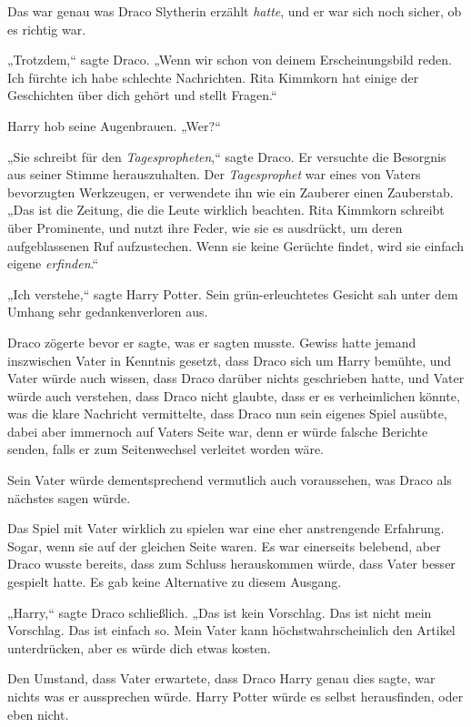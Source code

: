 {Das war genau was Draco Slytherin erzählt \emph{hatte}, und er war sich noch sicher, ob es richtig war.

„Trotzdem,“ sagte Draco. „Wenn wir schon von deinem Erscheinungsbild reden. Ich fürchte ich habe schlechte Nachrichten. Rita Kimmkorn hat einige der Geschichten über dich gehört und stellt Fragen.“

Harry hob seine Augenbrauen. „Wer?“

„Sie schreibt für den \emph{Tagespropheten},“ sagte Draco. Er versuchte die Besorgnis aus seiner Stimme herauszuhalten. Der \emph{Tagesprophet} war eines von Vaters bevorzugten Werkzeugen, er verwendete ihn wie ein Zauberer einen Zauberstab. „Das ist die Zeitung, die die Leute wirklich beachten. Rita Kimmkorn schreibt über Prominente, und nutzt ihre Feder, wie sie es ausdrückt, um deren aufgeblassenen Ruf aufzustechen. Wenn sie keine Gerüchte findet, wird sie einfach eigene \emph{erfinden}.“

„Ich verstehe,“ sagte Harry Potter. Sein grün-erleuchtetes Gesicht sah unter dem Umhang sehr gedankenverloren aus.

Draco zögerte bevor er sagte, was er sagten musste. Gewiss hatte jemand inszwischen Vater in Kenntnis gesetzt, dass Draco sich um Harry bemühte, und Vater würde auch wissen, dass Draco darüber nichts geschrieben hatte, und Vater würde auch verstehen, dass Draco nicht glaubte, dass er es verheimlichen könnte, was die klare Nachricht vermittelte, dass Draco nun sein eigenes Spiel ausübte, dabei aber immernoch auf Vaters Seite war, denn er würde falsche Berichte senden, falls er zum Seitenwechsel verleitet worden wäre.

Sein Vater würde dementsprechend vermutlich auch voraussehen, was Draco als nächstes sagen würde.

Das Spiel mit Vater wirklich zu spielen war eine eher anstrengende Erfahrung. Sogar, wenn sie auf der gleichen Seite waren. Es war einerseits belebend, aber Draco wusste bereits, dass zum Schluss herauskommen würde, dass Vater besser gespielt hatte. Es gab keine Alternative zu diesem Ausgang.

„Harry,“ sagte Draco schließlich. „Das ist kein Vorschlag. Das ist nicht mein Vorschlag. Das ist einfach so. Mein Vater kann höchstwahrscheinlich den Artikel unterdrücken, aber es würde dich etwas kosten.

Den Umstand, dass Vater erwartete, dass Draco Harry genau dies sagte, war nichts was er aussprechen würde. Harry Potter würde es selbst herausfinden, oder eben nicht.

}
